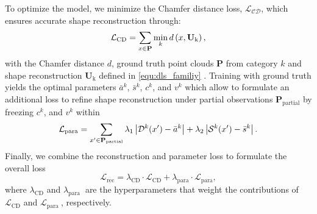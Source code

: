 To optimize the model, we minimize the Chamfer distance loss, $\mathcal{L_{\text{CD}}}$, which ensures accurate shape reconstruction through:
\begin{equation}
\vspace{-0.1cm}
\mathcal{L_{\text{CD}}} = \sum_{x \in \mathbf{P}} \min_{k} d\left(x, \mathbf{U}_{\text{k}}\right),
\label{equ:l_cd}
\vspace{-0.1cm}
\end{equation}
with the Chamfer distance $d$, ground truth point clouds $\mathbf{P}$ from category $k$ and shape reconstruction $\mathbf{U}_{\text{k}}$ defined in \cref{equ:dls_familiy} . Training with ground truth yields the optimal parameters $\bar{a}^k$, $\bar{s}^k$, $c^k$, and $v^k$ which allow to formulate an additional loss to refine shape reconstruction under partial observations $\mathbf{P}_{\text{partial}}$ by freezing $c^k$, and $v^k$ within
\begin{equation}
\vspace{-0.1cm}
\small
\mathcal{L}_{\text {para}} = \sum_{x' \in \mathbf{P}_{\text{partial}}} \lambda_1 \left| \mathcal{D}^k(x') - \bar{a}^k \right| + \lambda_2 \left| \mathcal{S}^k(x') - \bar{s}^k \right|.
\label{equ:l_para}
\vspace{-0.1cm}
\end{equation}
Finally, we combine the reconstruction and parameter loss to formulate the overall loss
\begin{equation}
\mathcal{L}_{\text{rec}} = \lambda_{\text{CD}} \cdot \mathcal{L}_{\text{CD}} + \lambda_{\text{para}} \cdot \mathcal{L}_{\text{para}},
\label{equ:l_rec}
\end{equation}
where $\lambda_{\mathrm{CD}}$ and $\lambda_{\text {para }}$ are the hyperparameters that weight the contributions of $\mathcal{L}_{\mathrm{CD}}$ and $\mathcal{L}_{\text {para }}$, respectively.

